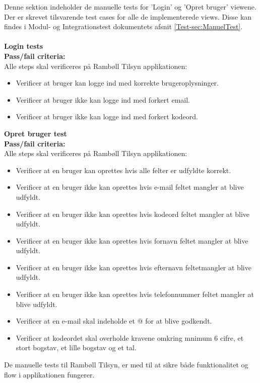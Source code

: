 Denne sektion indeholder de manuelle tests for 'Login' og 'Opret bruger' viewene. Der er skrevet tilsvarende test cases for alle de implementerede views. Disse kan findes i Modul- og Integrationstest dokumentets afsnit \ref{Test-sec:ManuelTest}. \\ \\
\textbf{Login tests} \\
\textbf{Pass/fail criteria:} \\
Alle steps skal verificeres på Rambøll Tilsyn applikationen:
\begin{itemize}[-]
	\item Verificer at bruger kan logge ind med korrekte brugeroplysninger.
	\item Verificer at bruger ikke kan logge ind med forkert email.
	\item Verificer at bruger ikke kan logge ind med forkert kodeord. \\
\end{itemize}

\textbf{Opret bruger test} \\
\textbf{Pass/fail criteria:} \\
Alle steps skal verificeres på Rambøll Tilsyn applikationen:
\begin{itemize}[-]
	\item Verificer at en bruger kan oprettes hvis alle felter er udfyldte korrekt.
	\item Verificer at en bruger ikke kan oprettes hvis e-mail feltet mangler at blive udfyldt.
	\item Verificer at en bruger ikke kan oprettes hvis kodeord feltet mangler at blive udfyldt.
	\item Verificer at en bruger ikke kan oprettes hvis fornavn feltet mangler at blive udfyldt.
	\item Verificer at en bruger ikke kan oprettes hvis efternavn feltetmangler at blive udfyldt.
	\item Verificer at en bruger ikke kan oprettes hvis telefonnummer feltet mangler at blive udfyldt.
	\item Verificer at en e-mail skal indeholde et @ for at blive godkendt.
	\item Verificer at kodeordet skal overholde kravene omkring mnimum 6 cifre, et stort bogstav, et lille bogstav og et tal.
\end{itemize}

De manuelle tests til Rambøll Tilsyn, er med til at sikre både funktionalitet og flow i applikationen fungerer.
